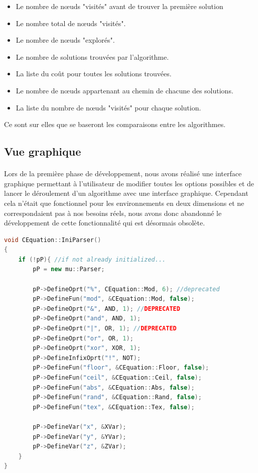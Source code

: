 \documentclass[pidr]{tnreport}
\begin{document}
\begin{itemize}
	
	\item Le nombre de nœuds "visités" avant de trouver la première solution
	\item Le nombre total de nœuds "visités".
	\item Le nombre de nœuds "explorés".
	\item Le nombre de solutions trouvées par l'algorithme.
	\item La liste du coût pour toutes les solutions trouvées.
	\item Le nombre de nœuds appartenant au chemin de chacune des solutions.
	\item La liste du nombre de nœuds "visités" pour chaque solution.

\end{itemize}

Ce sont sur elles que se baseront les comparaisons entre les algorithmes. 		
		
		\subsection{Vue graphique}		
		
\paragraph{}
Lors de la première phase de développement, nous avons réalisé une interface graphique permettant à l'utilisateur de modifier toutes les options possibles et de lancer le déroulement d'un algorithme avec une interface graphique. Cependant cela n'était que fonctionnel pour les environnements en deux dimensions et ne correspondaient pas à nos besoins réels, nous avons donc abandonné le développement de cette fonctionnalité qui est désormais obsolète.
		

\begin{lstlisting}[language=c++, caption={Premier Exemple}, label={lst:premierExemple}]
void CEquation::IniParser()
{
	if (!pP){ //if not already initialized...
		pP = new mu::Parser;

		pP->DefineOprt("%", CEquation::Mod, 6); //deprecated
		pP->DefineFun("mod", &CEquation::Mod, false);
		pP->DefineOprt("&", AND, 1); //DEPRECATED
		pP->DefineOprt("and", AND, 1);
		pP->DefineOprt("|", OR, 1); //DEPRECATED
		pP->DefineOprt("or", OR, 1);
		pP->DefineOprt("xor", XOR, 1);
		pP->DefineInfixOprt("!", NOT);
		pP->DefineFun("floor", &CEquation::Floor, false);
		pP->DefineFun("ceil", &CEquation::Ceil, false);
		pP->DefineFun("abs", &CEquation::Abs, false);
		pP->DefineFun("rand", &CEquation::Rand, false);
		pP->DefineFun("tex", &CEquation::Tex, false);
	
		pP->DefineVar("x", &XVar);
		pP->DefineVar("y", &YVar);
		pP->DefineVar("z", &ZVar);
	}
}
\end{lstlisting}
\end{document}
